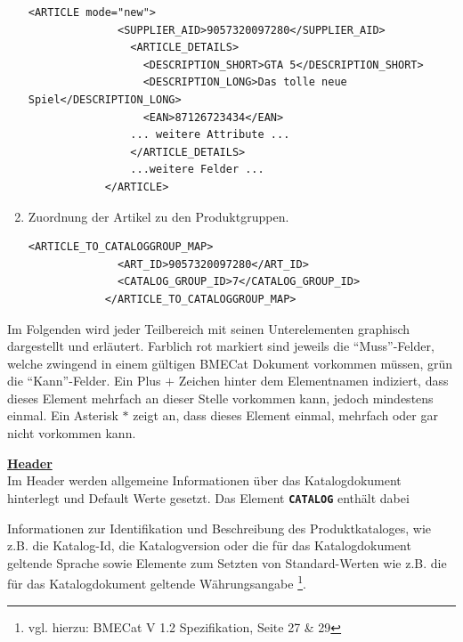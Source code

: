 \begin{enumerate}
			\begin{lstlisting}[caption={Ein Artikel in einem BMECat-Dokument }] 
			<ARTICLE mode="new">
			  <SUPPLIER_AID>9057320097280</SUPPLIER_AID>
			    <ARTICLE_DETAILS>
			      <DESCRIPTION_SHORT>GTA 5</DESCRIPTION_SHORT>
			      <DESCRIPTION_LONG>Das tolle neue Spiel</DESCRIPTION_LONG>
			      <EAN>87126723434</EAN>
				... weitere Attribute ...
			    </ARTICLE_DETAILS>
				...weitere Felder ...
			</ARTICLE>
			\end{lstlisting}
			
	
			\item Zuordnung der Artikel zu den Produktgruppen.
			\begin{lstlisting}[caption={Zuordnung der Artikel zu den Produktgruppen in einem BMECat-Dokument }] 
			<ARTICLE_TO_CATALOGGROUP_MAP>
			  <ART_ID>9057320097280</ART_ID>
			  <CATALOG_GROUP_ID>7</CATALOG_GROUP_ID>
			</ARTICLE_TO_CATALOGGROUP_MAP>
			\end{lstlisting}
		
		\end{enumerate}
	
	Im Folgenden wird jeder Teilbereich mit seinen Unterelementen graphisch dargestellt und erläutert. Farblich rot markiert sind jeweils die \enquote{Muss}-Felder, welche zwingend in einem gültigen BMECat Dokument vorkommen müssen, grün die \enquote{Kann}-Felder. Ein Plus \(+\) Zeichen hinter dem Elementnamen indiziert, dass dieses Element mehrfach an dieser Stelle vorkommen kann, jedoch mindestens einmal. Ein Asterisk \(*\) zeigt an, dass dieses Element einmal, mehrfach oder gar nicht vorkommen kann.  
	
	\textbf{\underline{Header}}\\
	Im Header werden allgemeine Informationen über das Katalogdokument hinterlegt und
	 Default Werte gesetzt. Das Element \texttt{\textbf{CATALOG}} enthält dabei %
	
	Informationen zur Identifikation und Beschreibung des Produktkataloges, wie z.B. die
	 Katalog-Id, die Katalogversion oder die für das Katalogdokument geltende Sprache sowie
	  Elemente zum Setzten von Standard-Werten wie z.B. die für das Katalogdokument geltende Währungsangabe \footnote{vgl. hierzu: BMECat V 1.2 Spezifikation, Seite 27 \& 29}.
	
